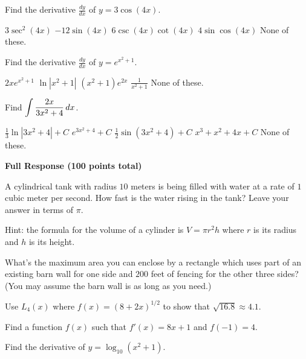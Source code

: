 \documentclass[12pt]{exam}
\newcommand{\ds}{\ensuremath{\displaystyle}}
\newcommand{\<}{\langle}
\renewcommand{\>}{\rangle}
\begin{document}
\begin{questions}
\vfill

\question[20]
Find the derivative \(\frac{dy}{dx}\) of \(y=3\cos(4x)\).

\begin{checkboxes}
  \choice \(3\sec^2(4x)\)
  \choice \(-12\sin(4x)\)
  \choice \(6\csc(4x)\cot(4x)\)
  \choice \(4\sin\cos(4x)\)
  \choice None of these.
\end{checkboxes}

\vfill
\newpage

\question[20]
Find the derivative \(\frac{dy}{dx}\) of \(y=e^{x^2+1}\).

\begin{checkboxes}
  \choice \(2xe^{x^2+1}\)
  \choice \(\ln|x^2+1|\)
  \choice \((x^2+1)e^{2x}\)
  \choice \(\frac{1}{x^2+1}\)
  \choice None of these.
\end{checkboxes}

\vfill

\question[20]
Find \(\ds\int \frac{2x}{3x^2+4}\,dx\).

\begin{checkboxes}
  \choice \(\frac{1}{3}\ln|3x^2+4|+C\)
  \choice \(e^{3x^2+4}+C\)
  \choice \(\frac{1}{2}\sin(3x^2+4)+C\)
  \choice \(x^3+x^2+4x+C\)
  \choice None of these.
\end{checkboxes}

\vfill


\end{questions}




\newpage



\begin{center}
  \textbf{Full Response (100 points total)}
\end{center}

\begin{questions}

\setcounter{question}{8}

\question[20]
  A cylindrical tank with radius \(10\) meters is being filled with water
  at a rate of \(1\) cubic meter per second. How fast is the water rising
  in the tank? Leave your answer in terms of \(\pi\).

  Hint: the formula for the volume of a cylinder is
  \(V=\pi r^2h\) where \(r\) is its radius and \(h\) is its height.

\newpage

\question[20]
  What's the maximum area you can enclose by a rectangle which uses part of
  an existing barn wall for one side and \(200\) feet of
  fencing for the other three sides? (You may assume the barn wall is
  as long as you need.)

\newpage

\question[20]
  Use \(L_4(x)\) where \(f(x)=(8+2x)^{1/2}\) to show that
  \(\sqrt{16.8}\approx 4.1\).

\newpage

\question[20]
  Find a function \(f(x)\) such that \(f'(x)=8x+1\) and
  \(f(-1)=4\).

\newpage

\question[20]
  Find the derivative of \(y=\log_{10}(x^2+1)\).

\end{questions}
\end{document}
